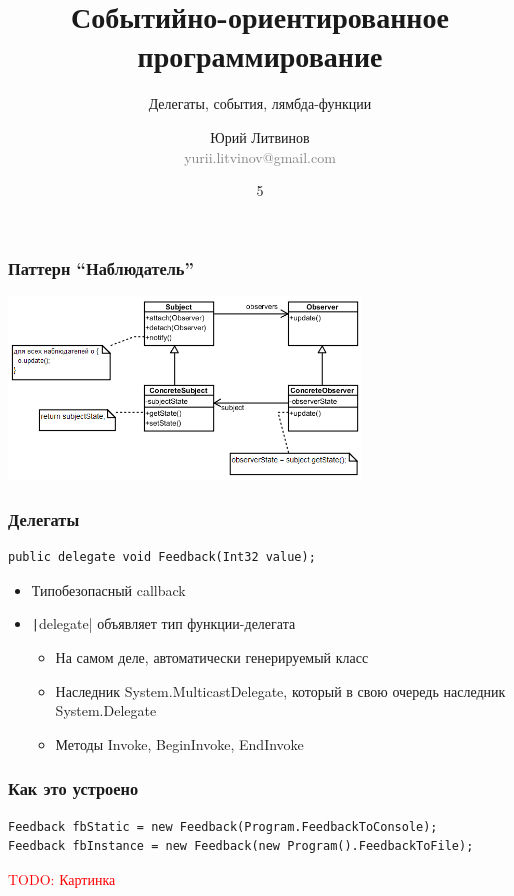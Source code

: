 \documentclass[xetex,mathserif,serif]{beamer}
\title{Событийно-ориентированное программирование}
\subtitle{Делегаты, события, лямбда-функции}
\author[Юрий Литвинов]{Юрий Литвинов\\\small{\textcolor{gray}{yurii.litvinov@gmail.com}}}
\date{5}
\newcommand{\todo}[1] {
	\begin{center}\textcolor{red}{TODO: #1}\end{center}
}
\begin{document}
	\frame{\titlepage}

	\begin{frame}
		\frametitle{Паттерн ``Наблюдатель''}
		\begin{center}
			\includegraphics[width=0.7\textwidth]{observer.png}
		\end{center}
	\end{frame}

	\begin{frame}[fragile]
		\frametitle{Делегаты}
		\begin{verbatim}
public delegate void Feedback(Int32 value);
		\end{verbatim}
		\begin{itemize}
			\item Типобезопасный callback
			\item \texttt|delegate| объявляет тип функции-делегата
			\begin{itemize}
				\item На самом деле, автоматически генерируемый класс
				\item Наследник System.MulticastDelegate, который в свою очередь наследник System.Delegate
				\item Методы Invoke, BeginInvoke, EndInvoke
			\end{itemize}
		\end{itemize}
	\end{frame}

	\begin{frame}[fragile]
		\frametitle{Как это устроено}
		\begin{verbatim}
Feedback fbStatic = new Feedback(Program.FeedbackToConsole);
Feedback fbInstance = new Feedback(new Program().FeedbackToFile);
		\end{verbatim}
		\todo{Картинка}
	\end{frame}
\end{document}

